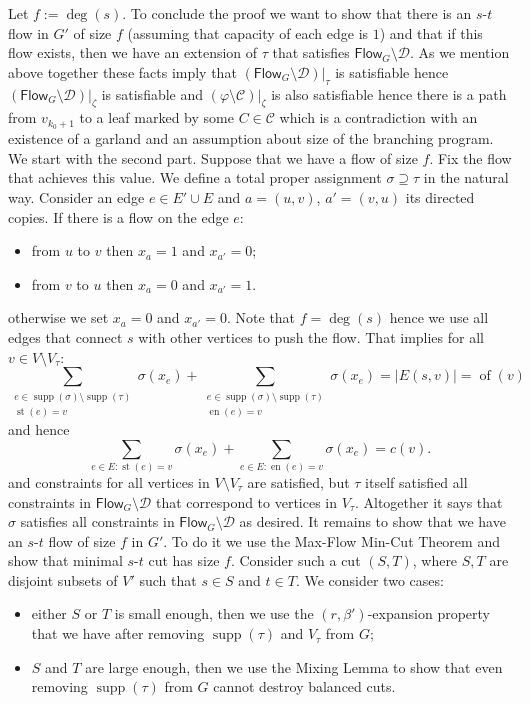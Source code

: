 \documentclass[10pt,a4paper]{article}
\newcommand{\Flow}{\mathsf{Flow}}
\newcommand{\supp}{\operatorname{supp}}
\newcommand{\st}{\operatorname{st}}
\newcommand{\en}{\operatorname{en}}
\newcommand{\of}{\operatorname{of}}
\begin{document}
Let $f:=\deg(s)$. To conclude the proof we want to show that there is an $s$-$t$ flow in $G'$ of size $f$ (assuming that capacity of each edge is $1$) and that if this flow exists, then we have an extension of $\tau$ that satisfies $\Flow_G\setminus\mathcal D$. As we mention above together these facts imply that $(\Flow_G\setminus\mathcal D)|_\tau$ is satisfiable hence $(\Flow_G\setminus\mathcal D)|_\zeta$ is satisfiable and $(\varphi\setminus\mathcal C)|_\zeta$ is also satisfiable hence there is a path from $v_{k_0+1}$ to a leaf marked by some $C\in\mathcal C$ which is a contradiction with an existence of a garland and an assumption about size of the branching program.
We start with the second part. Suppose that we have a flow of size $f$. Fix the flow that achieves this value. We define a total proper assignment $\sigma\supseteq\tau$ in the natural way. Consider an edge $e\in E'\cup E$ and $a=(u,v)$, $a'=(v,u)$ its directed copies. If there is a flow on the edge $e$:
\begin{itemize}\item from $u$ to $v$ then $x_a=1$ and $x_{a'}=0$;
\item from $v$ to $u$ then $x_a=0$ and $x_{a'}=1$.\end{itemize}
otherwise we set $x_a=0$ and $x_{a'}=0$.
Note that $f=\deg(s)$ hence we use all edges that connect $s$ with other vertices to push the flow. That implies for all $v\in V\setminus V_\tau$:
\[\sum_{\substack{e\in\supp(\sigma)\setminus\supp(\tau)\\\st(e)=v}}\sigma(x_e)+\sum_{\substack{e\in\supp(\sigma)\setminus\supp(\tau)\\\en(e)=v}}\sigma(x_e)=|E(s,v)|=\of(v)\]
and hence
\[\sum_{e\in E:\st(e)=v}\sigma(x_e)+\sum_{e\in E:\en(e)=v}\sigma(x_e)=c(v).\]
and constraints for all vertices in $V\setminus V_\tau$ are satisfied, but $\tau$ itself satisfied all constraints in $\Flow_G\setminus\mathcal D$ that correspond to vertices in $V_\tau$. Altogether it says that $\sigma$ satisfies all constraints in $\Flow_G\setminus\mathcal D$ as desired.
It remains to show that we have an $s$-$t$ flow of size $f$ in $G'$. To do it we use the Max-Flow Min-Cut Theorem and show that minimal $s$-$t$ cut has size $f$. Consider such a cut $(S,T)$, where $S,T$ are disjoint subsets of $V'$ such that $s\in S$ and $t\in T$. We consider two cases:
\begin{itemize}\item either $S$ or $T$ is small enough, then we use the $(r,\beta')$-expansion property that we have after removing $\supp(\tau)$ and $V_\tau$ from $G$;
\item $S$ and $T$ are large enough, then we use the Mixing Lemma to show that even removing $\supp(\tau)$ from $G$ cannot destroy balanced cuts.\end{itemize}
\end{document}
